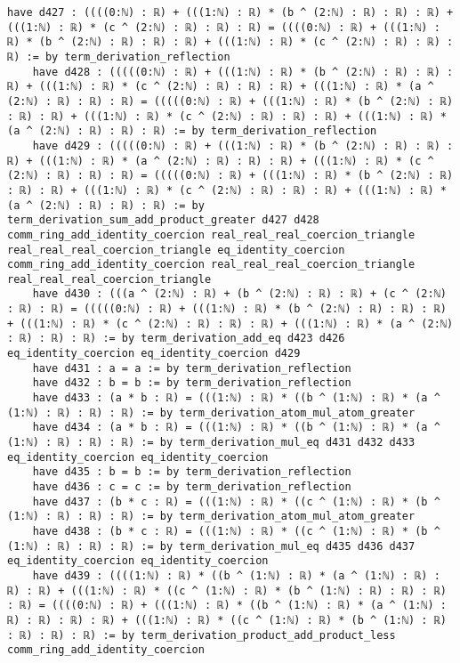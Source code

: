 \documentclass{article}
\begin{document}
\begin{tcolorbox}[colback=white!10, width=\linewidth]
\begin{lstlisting}[language=Lean4]
    have d427 : ((((0:ℕ) : ℝ) + (((1:ℕ) : ℝ) * (b ^ (2:ℕ) : ℝ) : ℝ) : ℝ) + (((1:ℕ) : ℝ) * (c ^ (2:ℕ) : ℝ) : ℝ) : ℝ) = ((((0:ℕ) : ℝ) + (((1:ℕ) : ℝ) * (b ^ (2:ℕ) : ℝ) : ℝ) : ℝ) + (((1:ℕ) : ℝ) * (c ^ (2:ℕ) : ℝ) : ℝ) : ℝ) := by term_derivation_reflection
    have d428 : (((((0:ℕ) : ℝ) + (((1:ℕ) : ℝ) * (b ^ (2:ℕ) : ℝ) : ℝ) : ℝ) + (((1:ℕ) : ℝ) * (c ^ (2:ℕ) : ℝ) : ℝ) : ℝ) + (((1:ℕ) : ℝ) * (a ^ (2:ℕ) : ℝ) : ℝ) : ℝ) = (((((0:ℕ) : ℝ) + (((1:ℕ) : ℝ) * (b ^ (2:ℕ) : ℝ) : ℝ) : ℝ) + (((1:ℕ) : ℝ) * (c ^ (2:ℕ) : ℝ) : ℝ) : ℝ) + (((1:ℕ) : ℝ) * (a ^ (2:ℕ) : ℝ) : ℝ) : ℝ) := by term_derivation_reflection
    have d429 : (((((0:ℕ) : ℝ) + (((1:ℕ) : ℝ) * (b ^ (2:ℕ) : ℝ) : ℝ) : ℝ) + (((1:ℕ) : ℝ) * (a ^ (2:ℕ) : ℝ) : ℝ) : ℝ) + (((1:ℕ) : ℝ) * (c ^ (2:ℕ) : ℝ) : ℝ) : ℝ) = (((((0:ℕ) : ℝ) + (((1:ℕ) : ℝ) * (b ^ (2:ℕ) : ℝ) : ℝ) : ℝ) + (((1:ℕ) : ℝ) * (c ^ (2:ℕ) : ℝ) : ℝ) : ℝ) + (((1:ℕ) : ℝ) * (a ^ (2:ℕ) : ℝ) : ℝ) : ℝ) := by term_derivation_sum_add_product_greater d427 d428 comm_ring_add_identity_coercion real_real_real_coercion_triangle real_real_real_coercion_triangle eq_identity_coercion comm_ring_add_identity_coercion real_real_real_coercion_triangle real_real_real_coercion_triangle
    have d430 : (((a ^ (2:ℕ) : ℝ) + (b ^ (2:ℕ) : ℝ) : ℝ) + (c ^ (2:ℕ) : ℝ) : ℝ) = (((((0:ℕ) : ℝ) + (((1:ℕ) : ℝ) * (b ^ (2:ℕ) : ℝ) : ℝ) : ℝ) + (((1:ℕ) : ℝ) * (c ^ (2:ℕ) : ℝ) : ℝ) : ℝ) + (((1:ℕ) : ℝ) * (a ^ (2:ℕ) : ℝ) : ℝ) : ℝ) := by term_derivation_add_eq d423 d426 eq_identity_coercion eq_identity_coercion d429
    have d431 : a = a := by term_derivation_reflection
    have d432 : b = b := by term_derivation_reflection
    have d433 : (a * b : ℝ) = (((1:ℕ) : ℝ) * ((b ^ (1:ℕ) : ℝ) * (a ^ (1:ℕ) : ℝ) : ℝ) : ℝ) := by term_derivation_atom_mul_atom_greater
    have d434 : (a * b : ℝ) = (((1:ℕ) : ℝ) * ((b ^ (1:ℕ) : ℝ) * (a ^ (1:ℕ) : ℝ) : ℝ) : ℝ) := by term_derivation_mul_eq d431 d432 d433 eq_identity_coercion eq_identity_coercion
    have d435 : b = b := by term_derivation_reflection
    have d436 : c = c := by term_derivation_reflection
    have d437 : (b * c : ℝ) = (((1:ℕ) : ℝ) * ((c ^ (1:ℕ) : ℝ) * (b ^ (1:ℕ) : ℝ) : ℝ) : ℝ) := by term_derivation_atom_mul_atom_greater
    have d438 : (b * c : ℝ) = (((1:ℕ) : ℝ) * ((c ^ (1:ℕ) : ℝ) * (b ^ (1:ℕ) : ℝ) : ℝ) : ℝ) := by term_derivation_mul_eq d435 d436 d437 eq_identity_coercion eq_identity_coercion
    have d439 : ((((1:ℕ) : ℝ) * ((b ^ (1:ℕ) : ℝ) * (a ^ (1:ℕ) : ℝ) : ℝ) : ℝ) + (((1:ℕ) : ℝ) * ((c ^ (1:ℕ) : ℝ) * (b ^ (1:ℕ) : ℝ) : ℝ) : ℝ) : ℝ) = ((((0:ℕ) : ℝ) + (((1:ℕ) : ℝ) * ((b ^ (1:ℕ) : ℝ) * (a ^ (1:ℕ) : ℝ) : ℝ) : ℝ) : ℝ) + (((1:ℕ) : ℝ) * ((c ^ (1:ℕ) : ℝ) * (b ^ (1:ℕ) : ℝ) : ℝ) : ℝ) : ℝ) := by term_derivation_product_add_product_less comm_ring_add_identity_coercion

\end{lstlisting}
\end{tcolorbox}
\end{document}
